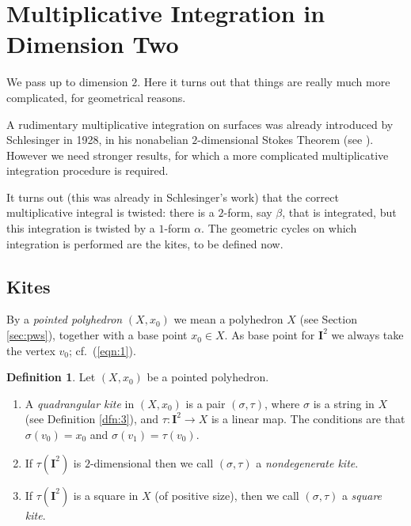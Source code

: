 \documentclass[10pt, a4paper]{amsart}
\theoremstyle{definition}
\newtheorem{dfn}[equation]{Definition}
\numberwithin{equation}{section}
\newcommand{\mbf}[1]{\mathbf{#1}}
\begin{document}
 



\cleardoublepage
\section{Multiplicative Integration in Dimension Two}
\label{sec.MI}

We pass up to dimension $2$. Here it turns out that things are
really much more complicated, for geometrical reasons.

A rudimentary multiplicative integration on surfaces was already
introduced by Schlesinger in 1928, in his
nonabelian $2$-dimensional Stokes Theorem
(see \cite[Appendix A.II,9]{DF}).
However we need stronger results, for which a more complicated
multiplicative integration procedure is required.

It turns out (this was already in Schlesinger's work) that the correct
multiplicative integral is twisted: there is a $2$-form, say $\beta$,
that is integrated, but this integration is twisted by a $1$-form
$\alpha$. The geometric cycles on which integration is performed are
the kites, to be defined now.

\subsection{Kites} \label{subsec:kites}
By a {\em pointed polyhedron} $(X, x_0)$ we mean a polyhedron $X$
(see Section \ref{sec:pws}), together with a base point $x_0 \in X$.
As base point for $\mbf{I}^2$ we always take the vertex
$v_0$; cf.\ (\ref{eqn:1}). 

\begin{dfn}
Let $(X, x_0)$ be a pointed polyhedron.
\begin{enumerate}
\item A {\em quadrangular kite} in $(X, x_0)$ is a pair $(\sigma, \tau)$, where
$\sigma$ is a string in $X$ (see Definition \ref{dfn:3}), and 
$\tau : \mbf{I}^2 \to X$
is a linear map. The conditions are that
$\sigma(v_0) = x_0$ and
$\sigma(v_1) = \tau(v_0)$.

\item If $\tau(\mbf{I}^{2})$ is $2$-dimensional then we call $(\sigma, \tau)$
a {\em nondegenerate kite}. 

\item If $\tau(\mbf{I}^{2})$ is a square in $X$ (of positive size), then we
call $(\sigma, \tau)$ a {\em square kite}.
\end{enumerate} 
\end{dfn}
\end{document}
